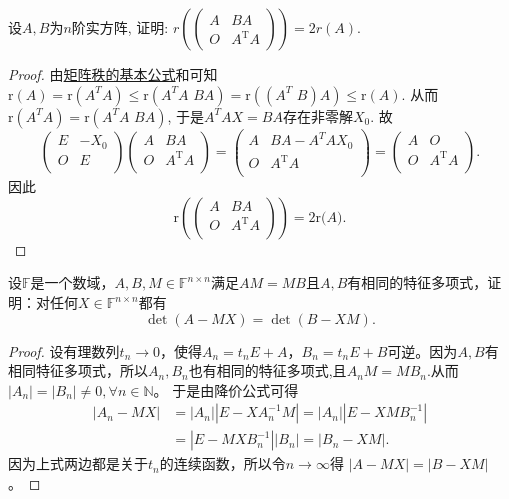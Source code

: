 \documentclass[../../main.tex]{subfiles}
\begin{document}
\begin{example}
设$A,B$为$n$阶实方阵, 证明: $r\left(\begin{pmatrix} A & BA \\ O & A^{\mathrm{T}}A \end{pmatrix}\right)=2r(A)$.
\end{example}
\begin{proof}
由\hyperref[proposition:矩阵秩的基本公式]{矩阵秩的基本公式}和可知
$\mathrm{r}\left( A \right) =\mathrm{r}\left( A^TA \right) \leqslant \mathrm{r}\left( A^TA\,\,BA \right) =\mathrm{r}\left( \left( A^T\,\,B \right) A \right) \leqslant \mathrm{r}\left( A \right) .$
从而$\mathrm{r}\left( A^TA \right) =\mathrm{r}\left( A^TA\,\,BA \right) $, 于是$A^TAX=BA$存在非零解$X_0$. 故
$$\left( \begin{matrix}
E&		-X_0\\
O&		E\\
\end{matrix} \right) \left( \begin{matrix}
A&		BA\\
O&		A^{\mathrm{T}}A\\
\end{matrix} \right) =\left( \begin{matrix}
A&		BA-A^TAX_0\\
O&		A^{\mathrm{T}}A\\
\end{matrix} \right) =\left( \begin{matrix}
A&		O\\
O&		A^{\mathrm{T}}A\\
\end{matrix} \right) .$$
因此
$$\mathrm{r}\left( \left( \begin{matrix}
A&		BA\\
O&		A^{\mathrm{T}}A\\
\end{matrix} \right) \right) =2\mathrm{r(}A).$$

\end{proof}

\begin{example}
设$\mathbb{F}$是一个数域，$A,B,M \in \mathbb{F}^{n \times n}$满足$AM = MB$且$A,B$有相同的特征多项式，证明：对任何$X \in \mathbb{F}^{n \times n}$都有
\[
\det (A - MX) = \det (B - XM). 
\]
\end{example}
\begin{proof}
设有理数列$t_n\rightarrow 0$，使得$A_n=t_nE+A$，$B_n=t_nE+B$可逆。因为$A,B$有相同特征多项式，所以$A_n,B_n$也有相同的特征多项式,且$A_nM=MB_n$.从而 $|A_n|=|B_n|\ne 0,\forall n\in \mathbb{N}$。
于是由降价公式可得
\begin{align*}
|A_n - MX| &= |A_n| |E - X A_n^{-1} M| = |A_n| |E - X M B_n^{-1}| \\
&= |E - M X B_n^{-1}| |B_n| = |B_n - X M|.
\end{align*}
因为上式两边都是关于$t_n$的连续函数，所以令$n\rightarrow \infty$得 $|A - MX| = |B - X M|$。

\end{proof}
\end{document}
